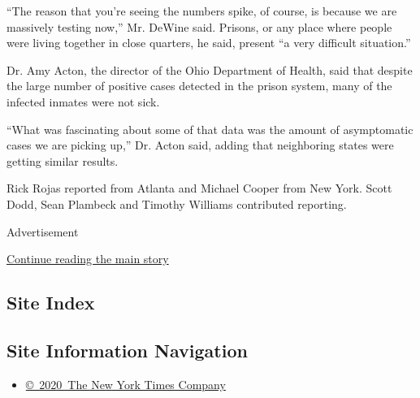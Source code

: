 ``The reason that you're seeing the numbers spike, of course, is because
we are massively testing now,'' Mr. DeWine said. Prisons, or any place
where people were living together in close quarters, he said, present
``a very difficult situation.''

Dr. Amy Acton, the director of the Ohio Department of Health, said that
despite the large number of positive cases detected in the prison
system, many of the infected inmates were not sick.

``What was fascinating about some of that data was the amount of
asymptomatic cases we are picking up,'' Dr. Acton said, adding that
neighboring states were getting similar results.

Rick Rojas reported from Atlanta and Michael Cooper from New York. Scott
Dodd, Sean Plambeck and Timothy Williams contributed reporting.

Advertisement

\protect\hyperlink{after-bottom}{Continue reading the main story}

\hypertarget{site-index}{%
\subsection{Site Index}\label{site-index}}

\hypertarget{site-information-navigation}{%
\subsection{Site Information
Navigation}\label{site-information-navigation}}

\begin{itemize}
\tightlist
\item
  \href{https://help.nytimes.com/hc/en-us/articles/115014792127-Copyright-notice}{©~2020~The
  New York Times Company}
\end{itemize}

